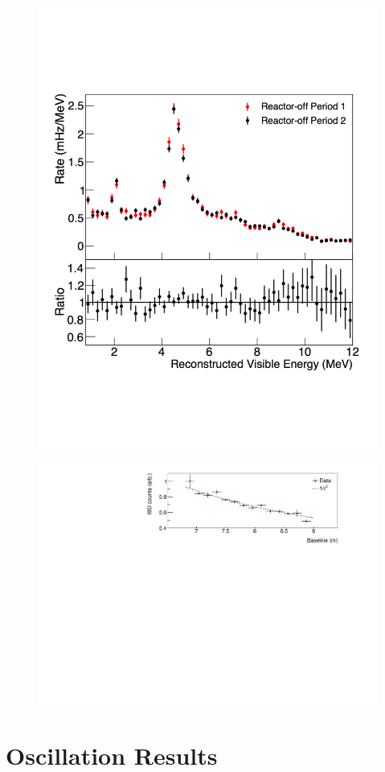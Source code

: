 \begin{figure}[H]
	\centering
	\includegraphics[width=0.7\linewidth]{tex/7-oscillation-images/RxOffSpectrum}
	\caption{}
	\label{fig:rxoffspectrum}
\end{figure}



\begin{figure}[H]
	\centering
	\includegraphics[width=0.7\linewidth]{tex/7-oscillation-images/IBDvsBaseline}
	\caption{}
	\label{fig:ibdvsbaseline}
\end{figure}



\section{Oscillation Results}


